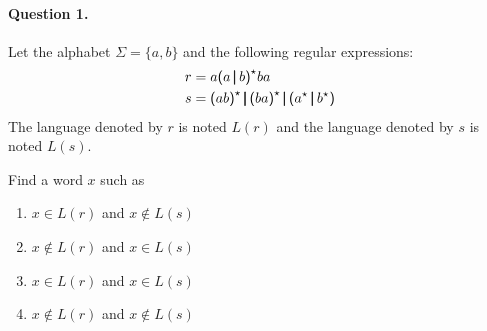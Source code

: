 \paragraph{Question 1.} Let the alphabet \(\Sigma = \{a, b\}\) and the
following regular expressions:
\begin{align*}
  r &= a \textsf{(} a \, \pmb{\lvert}{} \, b \textsf{)}^{\star}{} ba\\
  s &= \textsf{(} ab \textsf{)}^{\star}{} \, \pmb{\lvert}{} \, \textsf{(} ba
  \textsf{)}^{\star}{} \, \pmb{\lvert}{} \, \textsf{(} a^{\star}{} 
  \, \pmb{\lvert}{} \, b^{\star}\textsf{)}
\end{align*}
The language denoted by \(r\) is noted \(L(r)\) and the language
denoted by \(s\) is noted \(L(s)\).

\bigskip

\noindent Find a word \(x\) such as
\begin{enumerate}

  \item \(x \in L(r)\) and \(x \not\in L(s)\)

  \item \(x \not\in L(r)\) and \(x \in L(s)\)

  \item \(x \in L(r)\) and \(x \in L(s)\)

  \item \(x \not\in L(r)\) and \(x \not\in L(s)\)

\end{enumerate}
